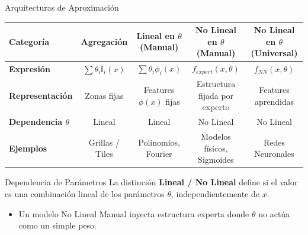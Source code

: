 \documentclass[xcolor=dvipsnames, handout]{beamer}
\begin{document}
\begin{frame}{Arquitecturas de Aproximaci\'on}
\centering

{\tiny
\setlength{\tabcolsep}{2pt}
\begin{tabular}{|l|c|c|c|c|}
\hline
\textbf{Categor\'ia} & \textbf{Agregaci\'on} & \textbf{Lineal en $\theta$ (Manual)} & \textbf{No Lineal en $\theta$ (Manual)} & \textbf{No Lineal en $\theta$ (Universal)} \\ \hline
\rule{0pt}{4ex} \textbf{Expresi\'on} & $\displaystyle \sum \theta_i \mathbb{I}_i(x)$ & $\displaystyle \sum \theta_i \phi_i(x)$ & $\displaystyle f_{expert}(x, \theta)$ & $\displaystyle f_{NN}(x, \theta)$ \\ [2ex] \hline
\textbf{Representaci\'on} & Zonas fijas & Features $\phi(x)$ fijas & Estructura fijada por experto & Features aprendidas \\ \hline
\textbf{Dependencia $\theta$} & Lineal & Lineal & No Lineal & No Lineal \\ \hline
\textbf{Ejemplos} & Grillas / Tiles & Polinomios, Fourier & Modelos f\'isicos, Sigmoides & Redes Neuronales \\ \hline
\end{tabular}
} %

\vspace{0.5cm}

\begin{alertblock}{Dependencia de Par\'ametros}
    La distinci\'on \textbf{Lineal / No Lineal} define si el valor es una combinaci\'on lineal de los par\'ametros $\theta$, independientemente de $x$.
    \begin{itemize}
  \item Un modelo No Lineal Manual inyecta estructura experta donde $\theta$ no act\'ua como un simple peso.
    \end{itemize}
\end{alertblock}
\end{frame}
\end{document}

